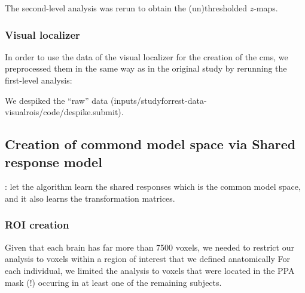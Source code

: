 The second-level analysis was rerun to obtain the (un)thresholded $z$-maps.


\subsubsection{Visual localizer}
In order to use the data of the visual localizer for the creation of the
\ac{cms}, we preprocessed them in the same way as in the original study
\citep{sengupta2016extension} by rerunning the first-level analysis:

We despiked the ``raw'' data
(inputs/studyforrest-data-visualrois/code/despike.submit).


\subsection{Creation of commond model space via Shared response model}

\citep{chen2015reduced}: let the algorithm learn the shared responses which is
the common model space, and it also learns the transformation matrices.


\subsubsection{ROI creation}


%
Given that each brain has far more than 7500 voxels, we needed to restrict our
analysis to voxels within a region of interest that we defined anatomically
%
For each individual, we limited the analysis to voxels that were located in the PPA mask (!) occuring in at least one of the remaining subjects.

